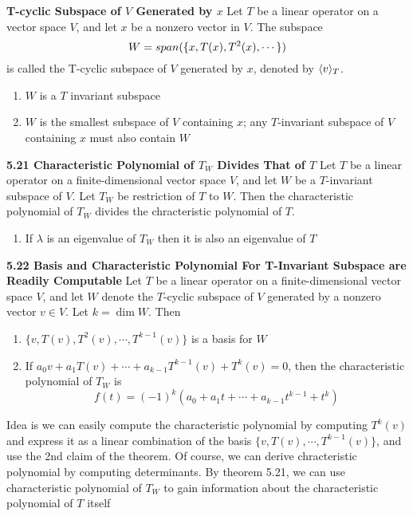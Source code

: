 \documentclass[11pt]{article}
\begin{document}
\begin{defn*}
    \textbf{T-cyclic Subspace of $V$ Generated by $x$} Let $T$ be a linear operator on a vector space $V$, and let $x$ be a nonzero vector in $V$. The subspace 
    \[
        W = \span{\{x, T(x), T^2(x), \cdots\}}    
    \]
    is called the T-cyclic subspace of $V$ generated by $x$, denoted by $\tinvariant{T}{v}$. 
    \begin{enumerate}
        \item $W$ is a $T$ invariant subspace 
        \item $W$ is the smallest subspace of $V$ containing $x$; any $T$-invariant subspace of $V$ containing $x$ must also contain $W$
    \end{enumerate}
\end{defn*}

 

\begin{theorem*}
    \textbf{5.21 Characteristic Polynomial of $T_W$ Divides That of $T$} Let $T$ be a linear operator on a finite-dimensional vector space $V$, and let $W$ be a $T$-invariant subspace of $V$. Let $T_W$ be restriction of $T$ to $W$. Then the characteristic polynomial of $T_W$ divides the chracteristic polynomial of $T$.
    \begin{enumerate}
        \item If $\lambda$ is an eigenvalue of $T_W$ then it is also an eigenvalue of $T$
    \end{enumerate}
\end{theorem*}


\begin{theorem*}
    \textbf{5.22 Basis and Characteristic Polynomial For T-Invariant Subspace are Readily Computable}
    Let $T$ be a linear operator on a finite-dimensional vector space $V$, and let $W$ denote the $T$-cyclic subspace of $V$ generated by a nonzero vector $v\in V$. Let $k = \dim{W}$. Then 
    \begin{enumerate}
        \item $\{v, T(v), T^2(v), \cdots, T^{k-1}(v)\}$ is a basis for $W$ 
        \item If $a_0v + a_1T(v) + \cdots + a_{k-1}T^{k-1}(v) + T^k(v) = 0$, then the characteristic polynomial of $T_W$ is 
        \[
            f(t) = (-1)^k(a_0 + a_1t + \cdots + a_{k-1}t^{k-1} + t^k)
        \] 
    \end{enumerate}
    Idea is we can easily compute the characteristic polynomial by computing $T^k(v)$ and express it as a linear combination of the basis $\{v, T(v), \cdots, T^{k-1}(v)\}$, and use the 2nd claim of the theorem. Of course, we can derive chracteristic polynomial by computing determinants. By theorem 5.21, we can use characteristic polynomial of $T_W$ to gain information about the characteristic polynomial of $T$ itself
\end{theorem*}
\end{document}
